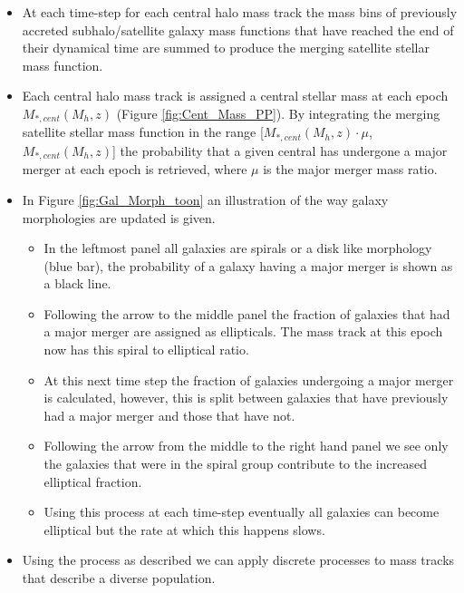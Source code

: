 \begin{itemize}
    \item At each time-step for each central halo mass track the mass bins of previously accreted subhalo/satellite galaxy mass functions that have reached the end of their dynamical time are summed to produce the merging satellite stellar mass function. 
    \item Each central halo mass track is assigned a central stellar mass at each epoch $M_{*,cent}(M_{h}, z)$ (Figure \ref{fig:Cent_Mass_PP}). By integrating the merging satellite stellar mass function in the range [$M_{*,cent}(M_{h}, z) \cdot \mu$, $M_{*,cent}(M_{h}, z)$] the probability that a given central has undergone a major merger at each epoch is retrieved, where $\mu$ is the major merger mass ratio. 
    \item In Figure \ref{fig:Gal_Morph_toon} an illustration of the way galaxy morphologies are updated is given. 
    \begin{itemize}
        \item In the leftmost panel all galaxies are spirals or a disk like morphology (blue bar), the probability of a galaxy having a major merger is shown as a black line.
        \item Following the arrow to the middle panel the fraction of galaxies that had a major merger are assigned as ellipticals. The mass track at this epoch now has this spiral to elliptical ratio.
        \item At this next time step the fraction of galaxies undergoing a major merger is calculated, however, this is split between galaxies that have previously had a major merger and those that have not. 
        \item Following the arrow from the middle to the right hand panel we see only the galaxies that were in the spiral group contribute to the increased elliptical fraction.
        \item Using this process at each time-step eventually all galaxies can become elliptical but the rate at which this happens slows.
    \end{itemize}
    \item Using the process as described we can apply discrete processes to mass tracks that describe a diverse population.
\end{itemize}

